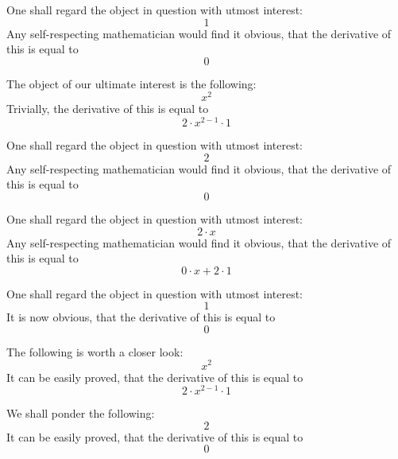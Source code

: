 \documentclass{article}
\begin{document}
One shall regard the object in question with utmost interest:
\begin{equation}
1 
\end{equation}
Any self-respecting mathematician would find it obvious, that the derivative of this is equal to
\begin{equation}
0 
\end{equation}

The object of our ultimate interest is the following:
\begin{equation}
x ^{2 } 
\end{equation}
Trivially, the derivative of this is equal to
\begin{equation}
2 \cdot x ^{2 - 1 } \cdot 1 
\end{equation}

One shall regard the object in question with utmost interest:
\begin{equation}
2 
\end{equation}
Any self-respecting mathematician would find it obvious, that the derivative of this is equal to
\begin{equation}
0 
\end{equation}

One shall regard the object in question with utmost interest:
\begin{equation}
2 \cdot x 
\end{equation}
Any self-respecting mathematician would find it obvious, that the derivative of this is equal to
\begin{equation}
0 \cdot x + 2 \cdot 1 
\end{equation}

One shall regard the object in question with utmost interest:
\begin{equation}
1 
\end{equation}
It is now obvious, that the derivative of this is equal to
\begin{equation}
0 
\end{equation}

The following is worth a closer look:
\begin{equation}
x ^{2 } 
\end{equation}
It can be easily proved, that the derivative of this is equal to
\begin{equation}
2 \cdot x ^{2 - 1 } \cdot 1 
\end{equation}

We shall ponder the following:
\begin{equation}
2 
\end{equation}
It can be easily proved, that the derivative of this is equal to
\begin{equation}
0 
\end{equation}
\end{document}
